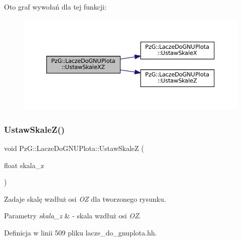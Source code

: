 Oto graf wywołań dla tej funkcji\+:\nopagebreak
\begin{figure}[H]
\begin{center}
\leavevmode
\includegraphics[width=350pt]{class_pz_g_1_1_lacze_do_g_n_u_plota_a4308151b54e105d302803146a3238699_cgraph}
\end{center}
\end{figure}
\mbox{\label{class_pz_g_1_1_lacze_do_g_n_u_plota_ab0486db3166d8db6580a221079af241f}} 
\subsubsection{\texorpdfstring{UstawSkaleZ()}{UstawSkaleZ()}}
{\footnotesize\ttfamily void Pz\+G\+::\+Lacze\+Do\+G\+N\+U\+Plota\+::\+Ustaw\+SkaleZ (\begin{DoxyParamCaption}\item[{float}]{skala\+\_\+z }\end{DoxyParamCaption})\hspace{0.3cm}{\ttfamily [inline]}}

Zadaje skalę wzdłuż osi {\itshape OZ} dla tworzonego rysunku. 
\begin{DoxyParams}{Parametry}
{\em skala\+\_\+z} & -\/ skala wzdłuż osi {\itshape OZ}. \\
\hline
\end{DoxyParams}


Definicja w linii 509 pliku lacze\+\_\+do\+\_\+gnuplota.\+hh.

